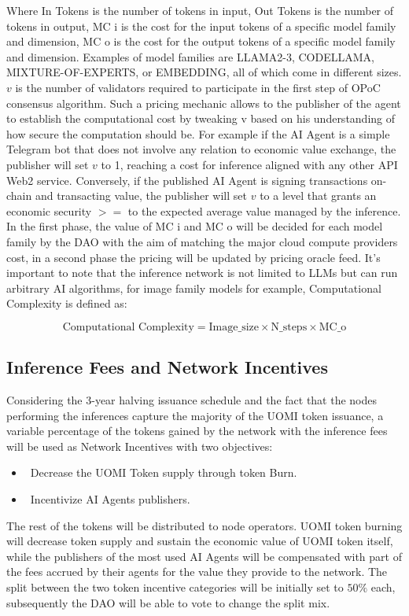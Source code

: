 \documentclass{article}
\begin{document}
Where In Tokens is the number of tokens in input, Out Tokens is the number of tokens in output, MC i is the cost for the input tokens of a specific model family and dimension, MC o is the cost for the output tokens of a specific model family and dimension.  Examples of model families are LLAMA2-3, CODELLAMA,  MIXTURE-OF-EXPERTS, or EMBEDDING, all of which come in different sizes.  \(v\) is the number of validators required to participate in the first step of OPoC consensus algorithm. Such a pricing mechanic allows to the publisher of the agent to establish the computational cost by tweaking v based on his understanding of how secure the computation should be. For example if the AI Agent is a simple Telegram bot that does not involve any relation to economic value exchange, the publisher will set \(v\) to 1, reaching a cost for inference aligned with any other API Web2 service. Conversely, if the published AI Agent is signing transactions on-chain and transacting value, the publisher will set \(v\) to a level that grants an economic security \(>=\) to the expected average value managed by the inference. 
In the first phase, the value of MC i and MC o will be decided for each model family by the DAO with the aim of matching the major cloud compute providers cost, in a second phase the pricing will be updated by pricing oracle feed. It's important to note that the inference network is not limited to LLMs but can run arbitrary AI algorithms, for image family models for example, Computational Complexity is defined as: 

\[\text{Computational Complexity} = \text{Image\_size} \times \text{N\_steps} \times \text{MC\_o} \]

\subsection{Inference Fees and Network Incentives}

Considering the 3-year halving issuance schedule and the fact that the nodes performing the inferences capture the majority of the UOMI token issuance, a variable percentage of the tokens gained by the network with the inference fees will be used as Network Incentives with two objectives: 
\begin{itemize}
\item \ Decrease the UOMI Token supply through token Burn.
\item \ Incentivize AI Agents publishers.
\end{itemize}

The rest of the tokens will be distributed to node operators. UOMI token burning will decrease token supply and sustain the economic value of UOMI token itself, while the publishers of the most used AI Agents will be compensated with part of the fees accrued by their agents for the value they provide to the network. The split between the two token incentive categories will be initially set to \( 50\%\) each, subsequently the DAO will be able to vote to change the split mix.
\end{document}
